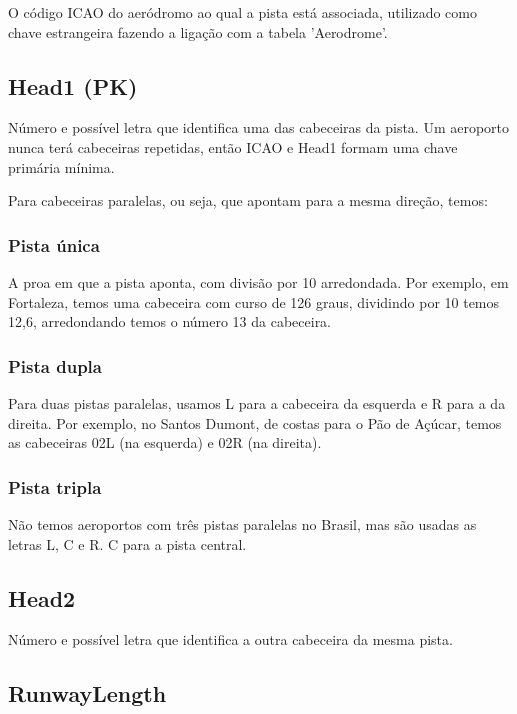 O código ICAO do aeródromo ao qual a pista está associada, utilizado como chave estrangeira 
fazendo a ligação com a tabela 'Aerodrome'.

\subsection{Head1 (PK)}

Número e possível letra que identifica uma das cabeceiras da pista. Um aeroporto nunca terá
cabeceiras repetidas, então ICAO e Head1 formam uma chave primária mínima.

Para cabeceiras paralelas, ou seja, que apontam para a mesma direção, temos:

\subsubsection{Pista única}

A proa em que a pista aponta, com divisão por 10 arredondada. Por exemplo, em Fortaleza,
temos uma cabeceira com curso de 126 graus, dividindo por 10 temos 12,6, arredondando
temos o número 13 da cabeceira.

\subsubsection{Pista dupla}

Para duas pistas paralelas, usamos L para a cabeceira da esquerda e R para a da direita.
Por exemplo, no Santos Dumont, de costas para o Pão de Açúcar, temos as cabeceiras 02L 
(na esquerda) e 02R (na direita).

\subsubsection{Pista tripla}

Não temos aeroportos com três pistas paralelas no Brasil, mas são usadas as letras
L, C e R. C para a pista central.

\subsection{Head2}

Número e possível letra que identifica a outra cabeceira da mesma pista.

\subsection{RunwayLength}

